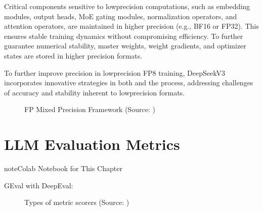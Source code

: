 \documentclass[letterpaper,11pt,english]{sphinxmanual}
\begin{document}
\begin{itemize}
\sphinxAtStartPar
Critical components sensitive to low\sphinxhyphen{}precision computations, such as
embedding modules, output heads, MoE gating modules, normalization
operators, and attention operators, are maintained in higher precision
(e.g., BF16 or FP32). This ensures stable training dynamics without
compromising efficiency. To further guarantee numerical stability,
master weights, weight gradients, and optimizer states are stored in
higher precision formats.

\sphinxAtStartPar
To further improve precision in low\sphinxhyphen{}precision FP8 training,
DeepSeek\sphinxhyphen{}V3 incorporates innovative strategies in both
 and the  process, addressing
challenges of accuracy and stability inherent to low\sphinxhyphen{}precision
formats.

\begin{figure}[htbp]
\centering
\capstart

\noindent{}
\caption{FP Mixed Precision Framework (Source: )}\label{\detokenize{pretraining:id32}}\end{figure}

\end{itemize}

\sphinxstepscope


\chapter{LLM Evaluation Metrics}
\label{\detokenize{evaluation:llm-evaluation-metrics}}\label{\detokenize{evaluation:evaluation}}\label{\detokenize{evaluation::doc}}
\begin{sphinxadmonition}{note}{Colab Notebook for This Chapter}

\sphinxAtStartPar
GEval with DeepEval: 
\end{sphinxadmonition}

\begin{figure}[htbp]
\centering
\capstart

\noindent{}
\caption{Types of metric scorers (Source: )}\label{\detokenize{evaluation:id3}}\label{\detokenize{evaluation:fig-metrics-llm}}\end{figure}
\end{document}
